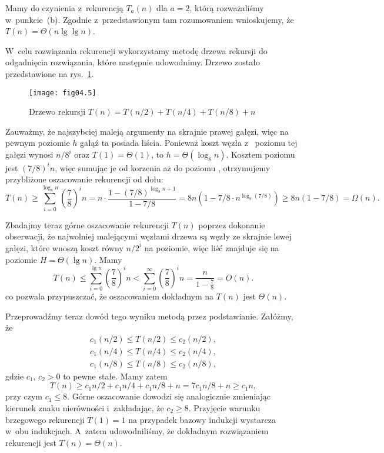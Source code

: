 \subproblem %
Mamy do czynienia z~rekurencją $T_a(n)$ dla $a=2$, którą rozważaliśmy w~punkcie~(b). Zgodnie z~przedstawionym tam rozumowaniem wnioskujemy, że $T(n)=\Theta(n\lg\lg n)$.

\subproblem %
W~celu rozwiązania rekurencji wykorzystamy metodę drzewa rekursji do odgadnięcia rozwiązania, które następnie udowodnimy. Drzewo zostało przedstawione na rys.~\ref{fig:4-4f}.
\begin{figure}[ht]
	\begin{center}
		\texttt{[image: fig04.5]}
	\end{center}
	\caption{Drzewo rekursji $T(n)=T(n/2)+T(n/4)+T(n/8)+n$} \label{fig:4-4f}
\end{figure}

Zauważmy, że najszybciej maleją argumenty na skrajnie prawej gałęzi, więc na pewnym poziomie $h$ gałąź ta posiada liścia. Ponieważ koszt węzła z~ poziomu tej gałęzi wynosi $n/8^i$ oraz $T(1)=\Theta(1)$, to $h=\Theta(\log_8n)$. Kosztem  poziomu jest $(7/8)^in$, więc sumując je od korzenia aż do poziomu , otrzymujemy przybliżone oszacowanie rekurencji od dołu:
\[
	T(n) \ge \sum_{i=0}^{\log_8n}\left(\frac{7}{8}\right)^in = n\cdot\frac{1-(7/8)^{\log_8n+1}}{1-7/8} = 8n(1-7/8\cdot n^{\log_8(7/8)}) \ge 8n(1-7/8) = \Omega(n).
\]

Zbadajmy teraz górne oszacowanie rekurencji $T(n)$ poprzez dokonanie obserwacji, że najwolniej malejącymi węzłami drzewa są węzły ze skrajnie lewej gałęzi, które wnoszą koszt równy $n/2^i$ na  poziomie, więc liść znajduje się na poziomie $H=\Theta(\lg n)$. Mamy
\[
	T(n) \le \sum_{i=0}^{\lg n}\left(\frac{7}{8}\right)^in < \sum_{i=0}^\infty\left(\frac{7}{8}\right)^in = \frac{n}{1-\frac{7}{8}} = O(n).
\]
co pozwala przypuszczać, że oszacowaniem dokładnym na $T(n)$ jest $\Theta(n)$.

Przeprowadźmy teraz dowód tego wyniku metodą przez podstawianie. Załóżmy, że
\begin{gather*}
	c_1(n/2) \le T(n/2) \le c_2(n/2), \\
	c_1(n/4) \le T(n/4) \le c_2(n/4), \\
	c_1(n/8) \le T(n/8) \le c_2(n/8),
\end{gather*}
gdzie $c_1$, $c_2>0$ to pewne stałe. Mamy zatem
\[
	T(n) \ge c_1n/2+c_1n/4+c_1n/8+n = 7c_1n/8+n \ge c_1n,
\]
przy czym $c_1\le8$. Górne oszacowanie dowodzi się analogicznie zmieniając kierunek znaku nierówności i~zakładając, że $c_2\ge8$. Przyjęcie warunku brzegowego rekurencji $T(1)=1$ na przypadek bazowy indukcji wystarcza w~obu indukcjach. A~zatem udowodniliśmy, że dokładnym rozwiązaniem rekurencji jest $T(n)=\Theta(n)$.

